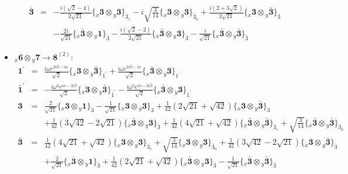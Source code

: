 \documentclass[english]{article}
\newcommand{\rep}[1]{\mathbf{#1}}
\newcommand{\repx}[2]{{}_{#2}\mathbf{#1}}
\newcommand{\subcg}[3]{\big\{ \repx{#1}{x}\otimes\repx{#2}{y}\big\}^{}_{#3}}
\begin{document}
\begin{itemize}
\begin{eqnarray*}
\rep{\bar{3}} &=& -\frac{i \left(\sqrt{2}-4\right)}{2 \sqrt{21}}\subcg{3}{3}{\bar{3}_{s}}-i \sqrt{\frac{3}{14}}\subcg{3}{3}{\bar{3}_{a}}+\frac{i \left(2+3 \sqrt{2}\right)}{2 \sqrt{21}}\subcg{3}{\bar{3}}{\bar{3}} \\ 
 & & -\frac{2 i}{\sqrt{21}}\subcg{\bar{3}}{1}{\bar{3}}-\frac{i \left(\sqrt{2}-2\right)}{2 \sqrt{21}}\subcg{\bar{3}}{3}{\bar{3}}-\frac{i}{\sqrt{21}}\subcg{\bar{3}}{\bar{3}}{\bar{3}}
\end{eqnarray*}
\item $\repx{6}{x}\otimes\repx{7}{y}\to\rep{8}^{(2)}$:
\begin{eqnarray*}
\rep{1^{\prime}} &=& \frac{i \omega  e^{2 i \beta -i \alpha }}{\sqrt{2}}\subcg{3}{\bar{3}}{1^{\prime}}+\frac{i \omega  e^{2 i \beta -i \alpha }}{\sqrt{2}}\subcg{\bar{3}}{3}{1^{\prime}}
\\
\rep{\bar{1}^{\prime}} &=& -\frac{i \omega ^2 e^{i \alpha -2 i \beta }}{\sqrt{2}}\subcg{3}{\bar{3}}{\bar{1}^{\prime}}-\frac{i \omega ^2 e^{i \alpha -2 i \beta }}{\sqrt{2}}\subcg{\bar{3}}{3}{\bar{1}^{\prime}}
\\
\rep{3} &=& \frac{2}{\sqrt{21}}\subcg{3}{1}{3}-\frac{1}{\sqrt{21}}\subcg{3}{3}{3}+\frac{1}{42} \left(2 \sqrt{21}+\sqrt{42}\right)\subcg{3}{\bar{3}}{3} \\ 
 & & +\frac{1}{42} \left(3 \sqrt{42}-2 \sqrt{21}\right)\subcg{\bar{3}}{3}{3}+\frac{1}{42} \left(4 \sqrt{21}+\sqrt{42}\right)\subcg{\bar{3}}{\bar{3}}{3_{s}}+\sqrt{\frac{3}{14}}\subcg{\bar{3}}{\bar{3}}{3_{a}}
\\
\rep{\bar{3}} &=& \frac{1}{42} \left(4 \sqrt{21}+\sqrt{42}\right)\subcg{3}{3}{\bar{3}_{s}}+\sqrt{\frac{3}{14}}\subcg{3}{3}{\bar{3}_{a}}+\frac{1}{42} \left(3 \sqrt{42}-2 \sqrt{21}\right)\subcg{3}{\bar{3}}{\bar{3}} \\ 
 & & +\frac{2}{\sqrt{21}}\subcg{\bar{3}}{1}{\bar{3}}+\frac{1}{42} \left(2 \sqrt{21}+\sqrt{42}\right)\subcg{\bar{3}}{3}{\bar{3}}-\frac{1}{\sqrt{21}}\subcg{\bar{3}}{\bar{3}}{\bar{3}}
\end{eqnarray*}
\end{itemize}
\end{document}
